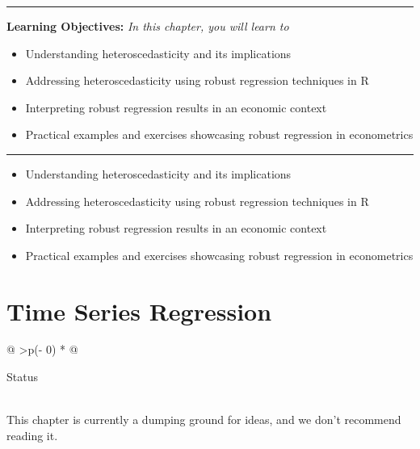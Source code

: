 \documentclass[
  letterpaper,
  paper =a4,
  twoside,
  openright,
  headsepline,
  footsepline,
  listof = totocnumbered,
  chapterprefix = true,
  firstiscover]{scrbook}
\providecommand{\abstractname}{Learning Objectives} %
\newenvironment{objectives}[1]{%
	\hrule
	\vspace{5pt}
	\small\textbf{\abstractname: } 
	\newline
	\vspace{0.1cm}
	\small\emph{#1} %
	\itshape %
}{%
	\vspace{5pt}
	\hrule
	\vspace{0.6cm}
}
\begin{document}
\begin{objectives}{In this chapter, you will learn to}
\begin{itemize}

\item{Understanding heteroscedasticity and its implications}

\item{Addressing heteroscedasticity using robust regression techniques in R}

\item{Interpreting robust regression results in an economic context}

\item{Practical examples and exercises showcasing robust regression in econometrics}

\end{itemize}

\end{objectives}

\begin{itemize}
\item
  Understanding heteroscedasticity and its implications
\item
  Addressing heteroscedasticity using robust regression techniques in R
\item
  Interpreting robust regression results in an economic context
\item
  Practical examples and exercises showcasing robust regression in
  econometrics
\end{itemize}


\hypertarget{time-series-regression}{%
\chapter{Time Series Regression}\label{time-series-regression}}

\begin{longtable}[]{@{}
  >{\centering\arraybackslash}p{(\columnwidth - 0\tabcolsep) * }@{}}
\toprule\noalign{}
\begin{minipage}[b]{\linewidth}\centering
Status
\end{minipage} \\
\midrule\noalign{}
\endhead
\bottomrule\noalign{}
\endlastfoot
This chapter is currently a dumping ground for ideas, and we don't
recommend reading it. \\
\end{longtable}
\end{document}
